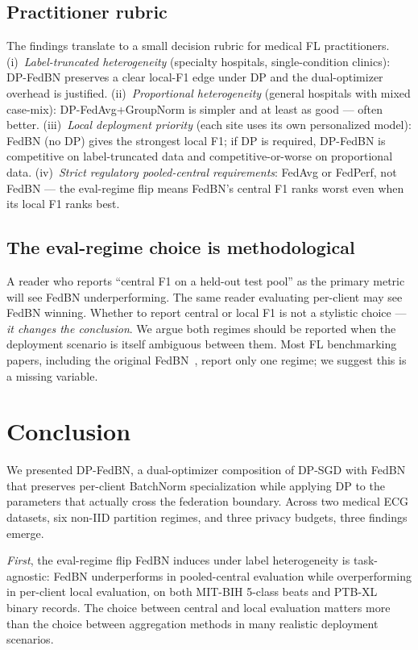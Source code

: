\documentclass[conference]{IEEEtran}
\begin{document}
\subsection{Practitioner rubric}
The findings translate to a small decision rubric for medical FL practitioners. (i)~\emph{Label-truncated heterogeneity} (specialty hospitals, single-condition clinics): DP-FedBN preserves a clear local-F1 edge under DP and the dual-optimizer overhead is justified. (ii)~\emph{Proportional heterogeneity} (general hospitals with mixed case-mix): DP-FedAvg+GroupNorm is simpler and at least as good --- often better. (iii)~\emph{Local deployment priority} (each site uses its own personalized model): FedBN (no DP) gives the strongest local F1; if DP is required, DP-FedBN is competitive on label-truncated data and competitive-or-worse on proportional data. (iv)~\emph{Strict regulatory pooled-central requirements}: FedAvg or FedPerf, not FedBN --- the eval-regime flip means FedBN's central F1 ranks worst even when its local F1 ranks best.

\subsection{The eval-regime choice is methodological}
A reader who reports ``central F1 on a held-out test pool'' as the primary metric will see FedBN underperforming. The same reader evaluating per-client may see FedBN winning. Whether to report central or local F1 is not a stylistic choice --- \emph{it changes the conclusion}. We argue both regimes should be reported when the deployment scenario is itself ambiguous between them. Most FL benchmarking papers, including the original FedBN~\cite{fedbn}, report only one regime; we suggest this is a missing variable.

\section{Conclusion}\label{sec:conclusion}
We presented DP-FedBN, a dual-optimizer composition of DP-SGD with FedBN that preserves per-client BatchNorm specialization while applying DP to the parameters that actually cross the federation boundary. Across two medical ECG datasets, six non-IID partition regimes, and three privacy budgets, three findings emerge.

\emph{First}, the eval-regime flip FedBN induces under label heterogeneity is task-agnostic: FedBN underperforms in pooled-central evaluation while overperforming in per-client local evaluation, on both MIT-BIH 5-class beats and PTB-XL binary records. The choice between central and local evaluation matters more than the choice between aggregation methods in many realistic deployment scenarios.
\end{document}
